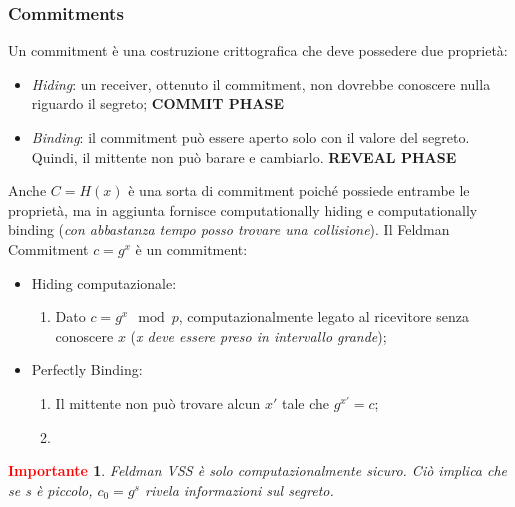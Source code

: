 \documentclass{book}
\newtheorem*{Importante}{\textbf{\textcolor{red}{Importante}}}
\begin{document}
\subsubsection{Commitments}
Un commitment è una costruzione crittografica che deve possedere due proprietà:\begin{itemize}
	\item \emph{Hiding}: un receiver, ottenuto il commitment, non dovrebbe conoscere nulla riguardo il segreto; \textbf{COMMIT PHASE}
	\item \emph{Binding}: il commitment può essere aperto solo con il valore del segreto\@. Quindi, il mittente non può barare e cambiarlo. \textbf{REVEAL PHASE}
\end{itemize}
Anche \(C=H(x)\) è una sorta di commitment poiché possiede entrambe le proprietà, ma in aggiunta fornisce computationally hiding e computationally binding (\emph{con abbastanza tempo posso trovare una collisione})\@.\newline
Il Feldman Commitment \(c=g^{x}\) è un commitment:\begin{itemize}
	\item Hiding computazionale:\begin{enumerate}
		      \item Dato \(c=g^{x}\mod{p}\), computazionalmente legato al ricevitore senza conoscere \(x\) (\emph{x deve essere preso in intervallo grande});
	      \end{enumerate}
	\item Perfectly Binding:\begin{enumerate}
		      \item Il mittente non può trovare alcun \(x'\) tale che \(g^{x'}=c\);
		      \item
	      \end{enumerate}

\end{itemize}
\begin{Importante}
	Feldman VSS è solo computazionalmente sicuro\@. Ciò implica che se s è piccolo, \(c_{0}=g^{s}\) rivela informazioni sul segreto.
\end{Importante}
\end{document}
